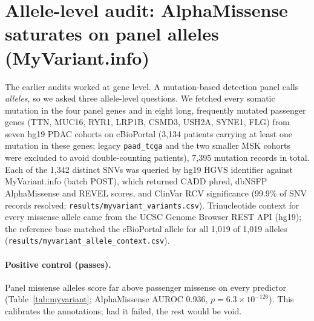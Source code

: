 \section{Allele-level audit: AlphaMissense saturates on panel alleles (MyVariant.info)}
The earlier audits worked at gene level. A mutation-based detection panel calls
\emph{alleles}, so we asked three allele-level questions. We fetched every
somatic mutation in the four panel genes and in eight long, frequently mutated
passenger genes (TTN, MUC16, RYR1, LRP1B, CSMD3, USH2A, SYNE1, FLG) from seven
hg19 PDAC cohorts on cBioPortal (3,134 patients carrying at least one mutation in these genes; legacy \texttt{paad\_tcga} and
the two smaller MSK cohorts were excluded to avoid double-counting patients),
7,395 mutation records in total. Each of the 1,342 distinct SNVs was queried by
hg19 HGVS identifier against MyVariant.info (batch POST), which returned CADD
phred, dbNSFP AlphaMissense and REVEL scores, and ClinVar RCV significance
(99.9\% of SNV records resolved; \texttt{results/myvariant\_variants.csv}).
Trinucleotide context for every missense allele came from the UCSC Genome
Browser REST API (hg19); the reference base matched the cBioPortal allele for
all 1,019 of 1,019 alleles (\texttt{results/myvariant\_allele\_context.csv}).

\paragraph{Positive control (passes).} Panel missense alleles score far above
passenger missense on every predictor (Table~\ref{tab:myvariant}; AlphaMissense
AUROC 0.936, $p=6.3\times10^{-126}$). This calibrates the annotations; had it failed, the
rest would be void.

